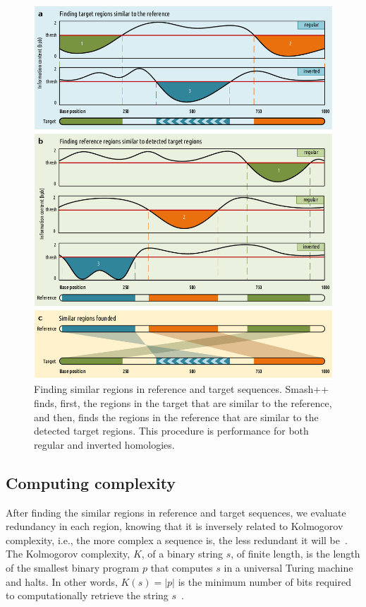 \documentclass[a4paper,num-refs]{oup-contemporary}
\begin{document}
 \begin{figure}[!h]
   \centering
   \includegraphics[width=.7\linewidth]{simil.pdf}
   \caption{Finding similar regions in reference and target sequences. Smash++ finds, first, the regions in the target that are similar to the reference, and then, finds the regions in the reference that are similar to the detected target regions. This procedure is performance for both regular and inverted homologies.}
   \label{fig.simil}
 \end{figure}

 \subsection{Computing complexity}
 After finding the similar regions in reference and target sequences, we evaluate redundancy in each region, knowing that it is inversely related to Kolmogorov complexity, i.e., the more complex a sequence is, the less redundant it will be~\cite{hosseini2018cryfa}. The Kolmogorov complexity, $K$, of a binary string $s$, of finite length, is the length of the smallest binary program $p$ that computes $s$ in a universal Turing machine and halts. In other words, $K(s)=|p|$ is the minimum number of bits required to computationally retrieve the string $s$~\cite{turing1936on,li2009an}.
\end{document}
